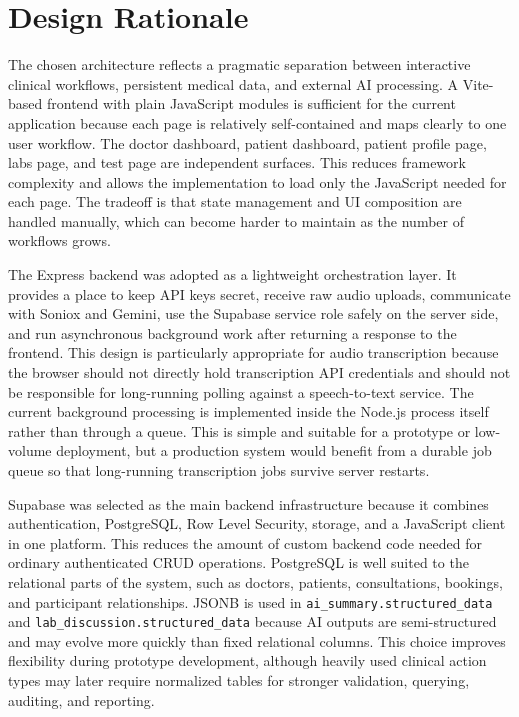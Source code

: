 \section{Design Rationale}
\label{sec:design-rationale}

The chosen architecture reflects a pragmatic separation between interactive clinical workflows, persistent medical data, and external AI processing. A Vite-based frontend with plain JavaScript modules is sufficient for the current application because each page is relatively self-contained and maps clearly to one user workflow. The doctor dashboard, patient dashboard, patient profile page, labs page, and test page are independent surfaces. This reduces framework complexity and allows the implementation to load only the JavaScript needed for each page. The tradeoff is that state management and UI composition are handled manually, which can become harder to maintain as the number of workflows grows.

The Express backend was adopted as a lightweight orchestration layer. It provides a place to keep API keys secret, receive raw audio uploads, communicate with Soniox and Gemini, use the Supabase service role safely on the server side, and run asynchronous background work after returning a response to the frontend. This design is particularly appropriate for audio transcription because the browser should not directly hold transcription API credentials and should not be responsible for long-running polling against a speech-to-text service. The current background processing is implemented inside the Node.js process itself rather than through a queue. This is simple and suitable for a prototype or low-volume deployment, but a production system would benefit from a durable job queue so that long-running transcription jobs survive server restarts.

Supabase was selected as the main backend infrastructure because it combines authentication, PostgreSQL, Row Level Security, storage, and a JavaScript client in one platform. This reduces the amount of custom backend code needed for ordinary authenticated CRUD operations. PostgreSQL is well suited to the relational parts of the system, such as doctors, patients, consultations, bookings, and participant relationships. JSONB is used in \texttt{ai\_summary.structured\_data} and \texttt{lab\_discussion.structured\_data} because AI outputs are semi-structured and may evolve more quickly than fixed relational columns. This choice improves flexibility during prototype development, although heavily used clinical action types may later require normalized tables for stronger validation, querying, auditing, and reporting.


